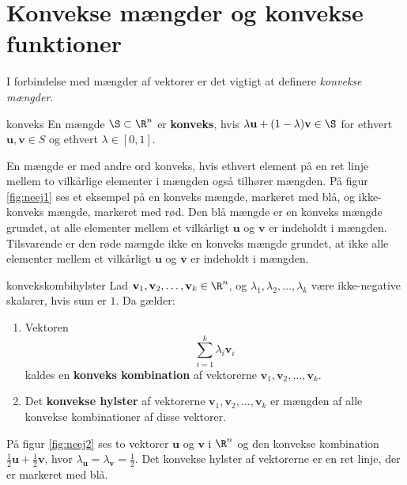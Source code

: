 \section{Konvekse mængder og konvekse funktioner}
\label{julieerlakker}
%
I forbindelse med mængder af vektorer er det vigtigt at definere \textit{konvekse mængder}.
%
\begin{defn}{}{konveks}
En mængde $\S \subset \R^n$ er \textbf{konveks}, hvis $\lambda \textbf{u} + (1- \lambda ) \textbf{v} \in \S$ for ethvert $\textbf{u}, \textbf{v} \in S$ og ethvert $\lambda \in [0,1]$. 
\end{defn}
\noindent
%
En mængde er med andre ord konveks, hvis ethvert element på en ret linje mellem to vilkårlige elementer i mængden også tilhører mængden. 
På figur \ref{fig:neej1} ses et eksempel på en konveks mængde, markeret med blå, og ikke-konveks mængde, markeret med rød.
Den blå mængde er en konveks mængde grundet, at alle elementer mellem et vilkårligt $\textbf{u}$ og $\textbf{v}$ er indeholdt i mængden.
Tilsvarende er den røde mængde ikke en konveks mængde grundet, at ikke alle elementer mellem et vilkårligt $\textbf{u}$ og $\textbf{v}$ er indeholdt i mængden.\\
%

%
\begin{defn}{}{konvekskombihylster}
Lad $\textbf{v}_1, \textbf{v}_2, \ldots, \textbf{v}_k \in \R^n$, og $\lambda_1, \lambda_2, \ldots, \lambda_k$ være ikke-negative skalarer, hvis sum er $1$. Da gælder:
%
\begin{enumerate}[label=(\alph*)]
	\item Vektoren $$\sum_{i=1}^{k} \lambda_i \textbf{v}_i$$ kaldes en \textbf{konveks kombination} af vektorerne $\textbf{v}_1, \textbf{v}_2, \ldots, \textbf{v}_k$. 
	\item Det \textbf{konvekse hylster} af vektorerne $\textbf{v}_1, \textbf{v}_2, \ldots, \textbf{v}_k$ er mængden af alle konvekse kombinationer af disse vektorer. 
\end{enumerate}
%
%
\end{defn}
%
På figur \ref{fig:neej2} ses to vektorer $\mathbf{u}$ og $\mathbf{v}$ i $\R^n$ og den konvekse kombination $\frac{1}{2} \mathbf{u}+\frac{1}{2} \mathbf{v}$, hvor $\lambda_\textbf{u} = \lambda_\textbf{v} = \frac{1}{2}$. 
Det konvekse hylster af vektorerne er en ret linje, der er markeret med blå. 
\\\\
%

